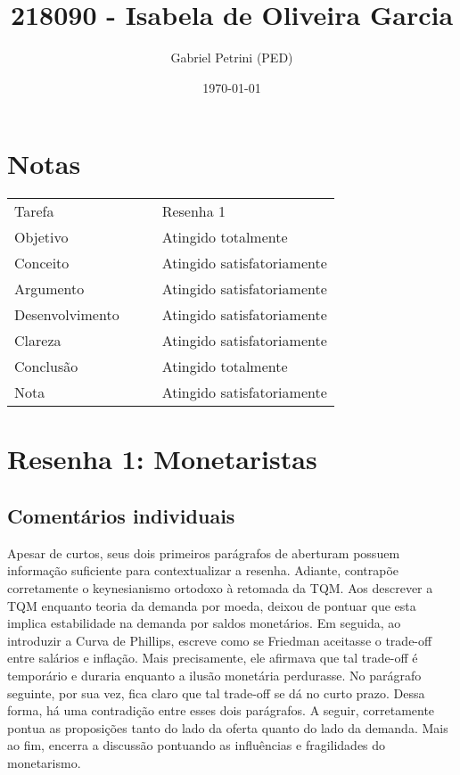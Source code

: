 \documentclass[11pt]{article}
\author{Gabriel Petrini (PED)}
\date{\today}
\title{218090 - Isabela de Oliveira Garcia}
\begin{document}
\maketitle


\section*{Notas}
\label{sec:orge6fd302}

\begin{center}
\begin{tabular}{llll}
Tarefa &  &  & Resenha 1\\
Objetivo &  &  & Atingido totalmente\\
Conceito &  &  & Atingido satisfatoriamente\\
Argumento &  &  & Atingido satisfatoriamente\\
Desenvolvimento &  &  & Atingido satisfatoriamente\\
Clareza &  &  & Atingido satisfatoriamente\\
Conclusão &  &  & Atingido totalmente\\
Nota &  &  & Atingido satisfatoriamente\\
\end{tabular}
\end{center}

\section*{Resenha 1: Monetaristas}
\label{sec:org5f05741}
\subsection*{Comentários individuais}
\label{sec:org341933b}

Apesar de curtos, seus dois primeiros parágrafos de aberturam possuem informação suficiente para contextualizar a resenha. Adiante, contrapõe corretamente o keynesianismo ortodoxo à retomada da TQM. Aos descrever a TQM enquanto teoria da demanda por moeda, deixou de pontuar que esta implica estabilidade na demanda por saldos monetários. Em seguida, ao introduzir a Curva de Phillips, escreve como se Friedman aceitasse o trade-off entre salários e inflação. Mais precisamente, ele afirmava que tal trade-off é temporário e duraria enquanto a ilusão monetária perdurasse. No parágrafo seguinte, por sua vez, fica claro que tal trade-off se dá no curto prazo. Dessa forma, há uma contradição entre esses dois parágrafos. A seguir, corretamente pontua as proposições tanto do lado da oferta quanto do lado da demanda. Mais ao fim, encerra a discussão pontuando as influências e fragilidades do monetarismo.
\end{document}
